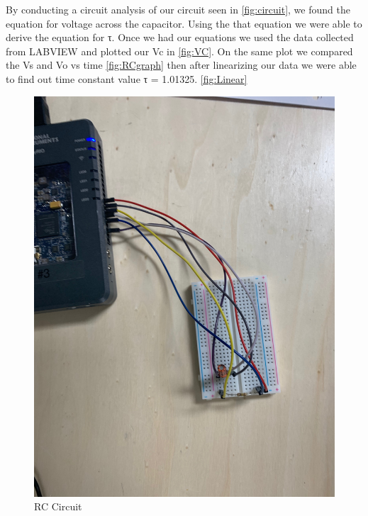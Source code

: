 \documentclass[10pt,twocolumn]{article}
\begin{document}
   
By conducting a circuit analysis of our circuit seen in \autoref{fig:circuit},
we found the equation for voltage across the capacitor. Using the that equation we were able to derive the equation for τ. Once we had our equations we used the data collected from LABVIEW and plotted our Vc in \autoref{fig:VC}.
On the same plot we compared the Vs and Vo vs time \autoref{fig:RCgraph} then after linearizing our data we were able to find out time constant value τ = 1.01325. \autoref{fig:Linear}




 


\begin{figure}[bt]
	\centering
	\includegraphics[width=.9\linewidth]{figures/RC.PNG}
	\caption{RC Circuit}
	\label{fig:circuit}
\end{figure}
\end{document}
